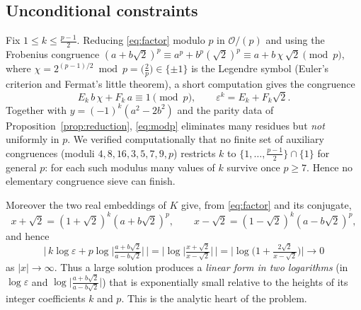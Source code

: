 \documentclass{amsart}
\theoremstyle{definition}
\begin{document}
\subsection*{Unconditional constraints}
Fix $1\le k\le \frac{p-1}{2}$. Reducing \eqref{eq:factor} modulo $p$ in
$\mathcal O/(p)$ and using the Frobenius congruence
$(a+b\sqrt2)^p\equiv a^p+b^p(\sqrt2)^p\equiv a+b\,\chi\,\sqrt2\pmod p$, where
$\chi=2^{(p-1)/2}\bmod p=\big(\tfrac2p\big)\in\{\pm1\}$ is the Legendre symbol
(Euler's criterion and Fermat's little theorem), a short computation gives the
congruence
\begin{equation}\label{eq:modp}
E_k\,b\,\chi+F_k\,a\equiv 1\pmod p,\qquad \varepsilon^k=E_k+F_k\sqrt2 .
\end{equation}
Together with $y=(-1)^k(a^2-2b^2)$ and the parity data of
Proposition~\ref{prop:reduction}, \eqref{eq:modp} eliminates many residues but
\emph{not} uniformly in $p$. We verified computationally that no finite set of
auxiliary congruences (moduli $4,8,16,3,5,7,9,p$) restricts $k$ to
$\{1,\dots,\frac{p-1}{2}\}\cap\{1\}$ for general $p$: for each such modulus
many values of $k$ survive once $p\ge7$. Hence no elementary congruence sieve
can finish.

Moreover the two real embeddings of $K$ give, from \eqref{eq:factor} and its
conjugate,
\begin{equation}\label{eq:embeddings}
x+\sqrt2=(1+\sqrt2)^{k}(a+b\sqrt2)^{p},\qquad
x-\sqrt2=(1-\sqrt2)^{k}(a-b\sqrt2)^{p},
\end{equation}
and hence
\begin{equation}\label{eq:logform}
\Big|\,k\log\varepsilon+p\log\Big|\tfrac{a+b\sqrt2}{a-b\sqrt2}\Big|\,\Big|
=\Big|\log\Big|\tfrac{x+\sqrt2}{x-\sqrt2}\Big|\,\Big|
=\Big|\log\Big(1+\tfrac{2\sqrt2}{x-\sqrt2}\Big)\Big|\longrightarrow0
\end{equation}
as $|x|\to\infty$. Thus a large solution produces a \emph{linear form in two
logarithms} (in $\log\varepsilon$ and $\log\big|\frac{a+b\sqrt2}{a-b\sqrt2}\big|$)
that is exponentially small relative to the heights of its integer
coefficients $k$ and $p$. This is the analytic heart of the problem.
\end{document}
